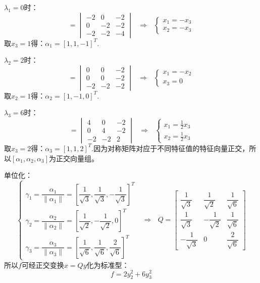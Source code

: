 \documentclass{article}
\begin{document}
\begin{jie}
$\lambda_1=0$时：
\begin{equation*}
  [\lambda E-A]=
  \begin{vmatrix}
-2 & 0 &-2\\
0&-2& -2\\
-2&-2&-4
  \end{vmatrix}~~~\Rightarrow~~~
  \begin{cases}
   x_1=-x_3\\
   x_2=-x_3
  \end{cases}
\end{equation*}
取$x_3=1$得：$\alpha_1=[1,1,-1]^T$.

$\lambda_2=2$时：
\begin{equation*}
  [\lambda E-A]=
  \begin{vmatrix}
0 & 0 &-2\\
0&0& -2\\
-2&-2&-2
  \end{vmatrix}~~~\Rightarrow~~~
  \begin{cases}
   x_1=-x_2\\
   x_3=0
  \end{cases}
\end{equation*}
取$x_2=1$得：$\alpha_2=[1,-1,0]^T$.

$\lambda_3=6$时：
\begin{equation*}
  [\lambda E-A]=
  \begin{vmatrix}
4 & 0 &-2\\
0&4& -2\\
-2&-2&2
  \end{vmatrix}~~~\Rightarrow~~~
  \begin{cases}
   x_1=\frac{1}{2}x_3\\
   x_2=\frac{1}{2}x_3
  \end{cases}
\end{equation*}
取$x_3=2$得：$\alpha_3=[1,1,2]^T$.因为对称矩阵对应于不同特征值的特征向量正交，所以$[\alpha_1,\alpha_2,\alpha_3]$为正交向量组。

单位化：
\begin{equation*}
\begin{cases}
\gamma_1=\dfrac{\alpha_1}{\|\alpha_1\|}=\left[\dfrac{1}{\sqrt{3}},\dfrac{1}{\sqrt{3}},-\dfrac{1}{\sqrt{3}}\right]^T\\[2mm]
\gamma_2=\dfrac{\alpha_2}{\|\alpha_2\|}=\left[\dfrac{1}{\sqrt{2}},-\dfrac{1}{\sqrt{2}},0\right]^T\\[2mm]
\gamma_3=\dfrac{\alpha_3}{\|\alpha_3\|}=\left[\dfrac{1}{\sqrt{6}},\dfrac{1}{\sqrt{6}},\dfrac{2}{\sqrt{6}}\right]^T
\end{cases}~~~\Rightarrow~~~Q=
\begin{bmatrix}
\dfrac{1}{\sqrt{3}}&\dfrac{1}{\sqrt{2}}&\dfrac{1}{\sqrt{6}}\\[2mm]
\dfrac{1}{\sqrt{3}}&-\dfrac{1}{\sqrt{2}}&\dfrac{1}{\sqrt{6}}\\[2mm]
-\dfrac{1}{\sqrt{3}}&0&\dfrac{2}{\sqrt{6}}
\end{bmatrix}
\end{equation*}
所以$f$可经正交变换$x=Qy$化为标准型：
\begin{equation*}
  f=2y_{2}^2+6y_{3}^2
\end{equation*}
\end{jie}
\end{document}

